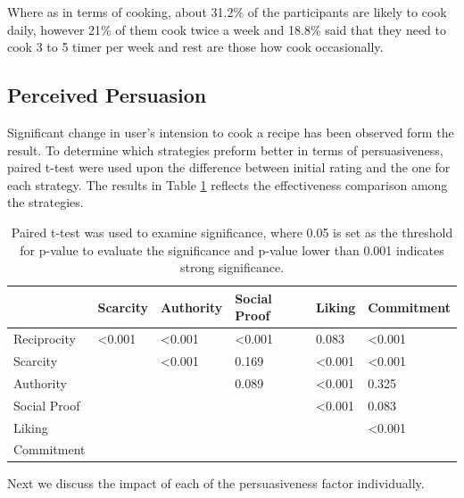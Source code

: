 Where as in terms of cooking, about 31.2\% of the participants are likely to cook daily, however 21\% of them cook twice a week and 18.8\% said that they need to cook 3 to 5 timer per week and rest are those how cook occasionally.

\subsection{Perceived Persuasion}

Significant change in user’s intension to cook a recipe has been observed form the result. To determine which strategies preform better in terms of persuasiveness, paired t-test were used upon the difference between initial rating and the one for each strategy. The results in Table \ref{table:persusasion-result} reflects the effectiveness comparison among the strategies. 

\begin{table}[ht]
	\centering %
	\begin{tabular}{p{2cm} p{2cm} p{2cm} p{2cm} p{2cm} p{2cm}}
		\hline\hline %
		& Scarcity & Authority & Social Proof & Liking & Commitment\\ %
		\hline %
		Reciprocity   & <0.001  & <0.001 & <0.001 &  0.083 & <0.001 \\ %
		Scarcity      &         & <0.001 &  0.169 & <0.001 & <0.001 \\
		Authority     &         &        &  0.089 & <0.001 &  0.325 \\
		Social Proof  &         &        &        & <0.001 &  0.083 \\
		Liking        &         &        &        &        & <0.001 \\
		Commitment    &         &        &        &        &  \\ [1ex] %
		\hline %
	\end{tabular}
	\caption{Paired t-test was used to examine significance, where 0.05 is set as the threshold for p-value to evaluate the significance and p-value lower than 0.001 indicates strong significance.}
	\label{table:persusasion-result}
\end{table}


Next we discuss the impact of each of the persuasiveness factor individually.\newline

